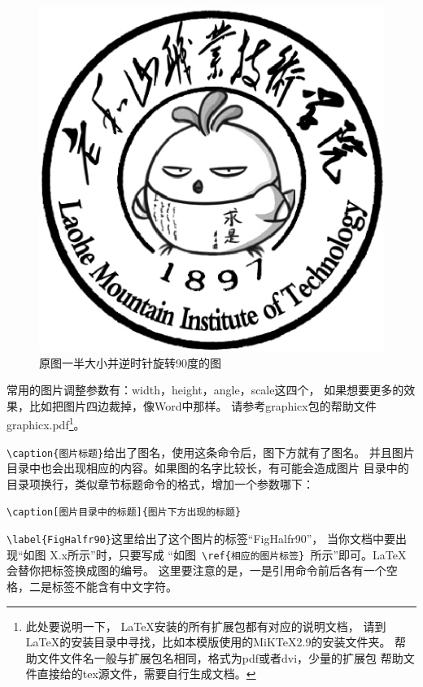 \begin{figure}[htb]
\centering
\includegraphics[scale=0.5,angle=90]{./Pictures/LHS.eps}
\caption{原图一半大小并逆时针旋转90度的图}
\label{FigHalfr90}
\end{figure}

常用的图片调整参数有：width，height，angle，scale这四个，
如果想要更多的效果，比如把图片四边裁掉，像Word中那样。
请参考graphicx包的帮助文件graphicx.pdf\footnote{此处要说明一下，
\LaTeX 安装的所有扩展包都有对应的说明文档，
请到\LaTeX 的安装目录中寻找，比如本模版使用的MiKTeX2.9的安装文件夹。
帮助文件文件名一般与扩展包名相同，格式为pdf或者dvi，少量的扩展包
帮助文件直接给的tex源文件，需要自行生成文档。}。

\verb+\caption{图片标题}+给出了图名，使用这条命令后，图下方就有了图名。
并且图片目录中也会出现相应的内容。如果图的名字比较长，有可能会造成图片
目录中的目录项换行，类似章节标题命令的格式，增加一个参数哪下：

\verb+\caption[图片目录中的标题]{图片下方出现的标题}+

\verb+\label{FigHalfr90}+这里给出了这个图片的标签“FigHalfr90”，
当你文档中要出现“如图 X.x所示”时，只要写成
“如图\verb+ \ref{相应的图片标签} +所示”即可。\LaTeX 会替你把标签换成图的编号。
这里要注意的是，一是引用命令前后各有一个空格，二是标签不能含有中文字符。

